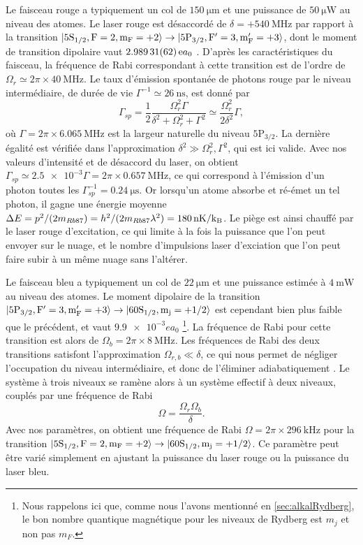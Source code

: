 Le faisceau rouge a typiquement un col de $\SI{150}{\um}$ et une puissance de $\SI{50}{\micro\watt}$ au niveau des atomes.
Le laser rouge est désaccordé de $\delta=+\SI{540}{\MHz}$ par rapport à la transition $ \ket{\mathrm{5S_{1/2},F=2,m_F=+2}} \rightarrow \ket{\mathrm{5P_{3/2},F'=3,m_F'=+3}}$, dont le moment de transition dipolaire vaut $\SI{2.98931 (62)} ea_0$ \cite{DATA_STECKRB87}.
D'après les caractéristiques du faisceau, la fréquence de Rabi correspondant à cette transition est de l'ordre de $\Omega_r \simeq 2\pi\times \SI{40}{\MHz}$.
Le taux d'émission spontanée de photons rouge par le niveau intermédiaire, de durée de vie $\Gamma^{-1} \simeq \SI{26}{\ns}$, est donné par
\begin{equation}
\label{eq:scattering_5P3/2}
\Gamma_{sp} = \frac{1}{2} \frac{\Omega_r^2 \Gamma}{\delta^2 + \Omega_r^2 + \Gamma^2}
\simeq \frac{\Omega_r^2}{2\delta^2} \Gamma,
\end{equation}
où $\Gamma = 2\pi \times \SI{6.065}{\MHz}$ est la largeur naturelle du niveau $\mathrm{5P_{3/2}}$.
La dernière égalité est vérifiée dans l'approximation $\delta^2 \gg \Omega_r^2, \Gamma^2$, qui est ici valide.
Avec nos valeurs d'intensité et de désaccord du laser, on obtient $\Gamma_{sp} \simeq \num{2.5e-3} \Gamma = 2\pi\times \SI{0.657}{\MHz}$, ce qui correspond à l'émission d'un photon  toutes les $\Gamma_{sp}^{-1} = \SI{0.24}{\us}$.
Or lorsqu'un atome absorbe et ré-émet un tel photon, il gagne une énergie moyenne
$\Delta E = p^2/(2m_{Rb87}) = h^2/(2m_{Rb87} \lambda^2) = \SI{180}{\nano\kelvin} / \mathrm{k_B}$.
Le piège est ainsi chauffé par le laser rouge d'excitation, ce qui limite à la fois la puissance que l'on peut envoyer sur le nuage, et le nombre d'impulsions laser d'exciation que l'on peut faire subir à un même nuage sans l'altérer.

Le faisceau bleu a typiquement un col de $\SI{22}{\um}$ et une puissance estimée à $\SI{4}{\milli\watt}$ au niveau des atomes.
Le moment dipolaire de la transition $ \ket{\mathrm{5P_{3/2},F'=3,m_F'=+3}} \rightarrow \ket{\mathrm{60S_{1/2},m_j=+1/2}}$ est cependant bien plus faible que le précédent, et vaut $\SI{9.9e-3} ea_0$
\footnote{Nous rappelons ici que, comme nous l'avons mentionné en \ref{sec:alkalRydberg}, le bon nombre quantique magnétique pour les niveaux de Rydberg est $m_j$ et non pas $m_F$.}.
La fréquence de Rabi pour cette transition est alors de $\Omega_b = 2\pi\times \SI{8}{\MHz}$.
Les fréquences de Rabi des deux transitions satisfont l'approximation $\Omega_{r,b} \ll \delta$, ce qui nous permet de négliger l'occupation du niveau intermédiaire, et donc de l'éliminer adiabatiquement \cite{TXT_ASPECTFABRE_QUANTOPT}.
Le système à trois niveaux se ramène alors à un système effectif à deux niveaux, couplés par une fréquence de Rabi
\begin{equation}
\label{eq:Rabi_2photons}
\Omega = \frac{\Omega_r \Omega_b}{\delta}.
\end{equation}
Avec nos paramètres, on obtient une fréquence de Rabi $\Omega = 2\pi \times \SI{296}{\kHz}$ pour la transition $\ket{\mathrm{5S_{1/2},F=2,m_F=+2}} \rightarrow \ket{\mathrm{60S_{1/2},m_j=+1/2}}$.
Ce paramètre peut être varié simplement en ajustant la puissance du laser rouge ou la puissance du laser bleu.

